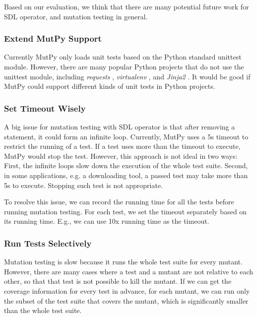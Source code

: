 \documentclass[12pt]{article}
\begin{document}
Based on our evaluation, we think that there are many potential future work for SDL operator, and mutation testing in general.

\subsubsection{Extend MutPy Support}

Currently MutPy only loads unit tests based on the Python standard unittest module. However, there are many popular Python projects that do not use the unittest module, including \emph{requests} \cite{requests}, \emph{virtualenv} \cite{virtualenv}, and \emph{Jinja2} \cite{jinja2}. It would be good if MutPy could support different kinds of unit tests in Python projects.

\subsubsection{Set Timeout Wisely}

A big issue for mutation testing with SDL operator is that after removing a statement, it could form an infinite loop. Currently, MutPy uses a 5s timeout to restrict the running of a test. If a test uses more than the timeout to execute, MutPy would stop the test. However, this approach is not ideal in two ways: First, the infinite loops slow down the execution of the whole test suite. Second, in some applications, e.g. a downloading tool, a passed test may take more than 5s to execute. Stopping such test is not appropriate.

To resolve this issue, we can record the running time for all the tests before running mutation testing. For each test, we set the timeout separately based on its running time. E.g., we can use 10x running time as the timeout.

\subsubsection{Run Tests Selectively}

Mutation testing is slow because it runs the whole test suite for every mutant. However, there are many cases where a test and a mutant are not relative to each other, so that that test is not possible to kill the mutant. If we can get the coverage information for every test in advance, for each mutant, we can run only the subset of the test suite that covers the mutant, which is significantly smaller than the whole test suite.
\end{document}
